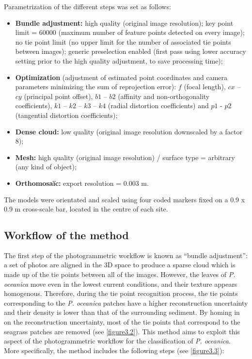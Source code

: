 Parametrization of the different steps was set as follows: 
\begin{itemize}
    \item \textbf{Bundle adjustment:} high quality (original image resolution); key point limit = 60000 (maximum number of feature points detected on every image); no tie point limit (no upper limit for the number of associated tie points between images); generic preselection enabled (first pass using lower accuracy setting prior to the high quality adjustment, to save processing time);
    \item \textbf{Optimization} (adjustment of estimated point coordinates and camera parameters minimizing the sum of reprojection error): $f$ (focal length), $cx$ – $cy$ (principal point offset), $b1$ – $b2$ (affinity and non-orthogonality coefficients), $k1$ – $k2$ – $k3$ – $k4$ (radial distortion coefficients) and $p1$ - $p2$ (tangential distortion coefficients);
    \item \textbf{Dense cloud:} low quality (original image resolution downscaled by a factor 8);
    \item \textbf{Mesh:} high quality (original image resolution) / surface type = arbitrary (any kind of object);
    \item \textbf{Orthomosaïc:} export resolution = 0.003 m. 
    
\end{itemize}

The models were orientated and scaled using four coded markers fixed on a 0.9 x 0.9 m cross-scale bar, located in the centre of each site.

\subsection{Workflow of the method}
The first step of the photogrammetric workflow is known as “bundle adjustment”: a set of photos are aligned in the 3D space to produce a sparse cloud which is made up of the tie points between all of the images. However, the leaves of \textit{P. oceanica} move even in the lowest current conditions, and their texture appears homogenous. Therefore, during the tie point recognition process, the tie points corresponding to the \textit{P. oceanica} patches have a higher reconstruction uncertainty and their density is lower than that of the surrounding sediment. By homing in on the reconstruction uncertainty, most of the tie points that correspond to the seagrass patches are removed (see \autoref{figure3.2}). This method aims to exploit this aspect of the photogrammetric workflow for the classification of \textit{P. oceanica}. More specifically, the method includes the following steps (see \autoref{figure3.3}):

